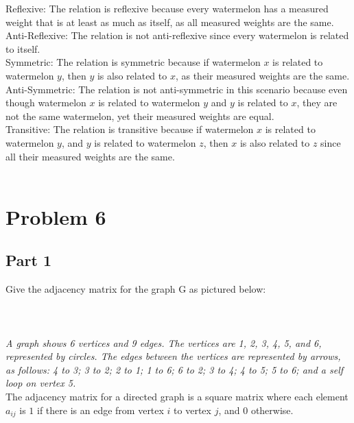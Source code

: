 \documentclass{amsart}
\theoremstyle{definition}
\theoremstyle{Exercise}
\theoremstyle{remark}
\theoremstyle{rule}
\numberwithin{equation}{section}
\begin{document}
\begin{enumerate}[label=(\alph*)]
Reflexive: The relation is reflexive because every watermelon has a measured weight that is at least as much as itself, as all measured weights are the same.\\
Anti-Reflexive: The relation is not anti-reflexive since every watermelon is related to itself.\\
Symmetric: The relation is symmetric because if watermelon \( x \) is related to watermelon \( y \), then \( y \) is also related to \( x \), as their measured weights are the same.\\
Anti-Symmetric: The relation is not anti-symmetric in this scenario because even though watermelon \( x \) is related to watermelon \( y \) and \( y \) is related to \( x \), they are not the same watermelon, yet their measured weights are equal.\\
Transitive: The relation is transitive because if watermelon \( x \) is related to watermelon \( y \), and \( y \) is related to watermelon \( z \), then \( x \) is also related to \( z \) since all their measured weights are the same.
\\\\
\end{enumerate}
 \newpage

\section*{Problem 6}
\subsection*{Part 1}
Give the adjacency matrix for the graph G as pictured below:\\
\\
\\\\
{\color{blue}{\bf Figure 2:} \emph{A graph shows 6 vertices and 9 edges. The vertices are 1, 2, 3, 4, 5, and 6, represented by circles. The edges between the vertices are represented by arrows, as follows: 4 to 3; 3 to 2; 2 to 1; 1 to 6; 6 to 2; 3 to 4; 4 to 5; 5 to 6; and a self loop on vertex 5.
}
}\\
The adjacency matrix for a directed graph is a square matrix where each element \( a_{ij} \) is \( 1 \) if there is an edge from vertex \( i \) to vertex \( j \), and \( 0 \) otherwise.\\
\end{document}
